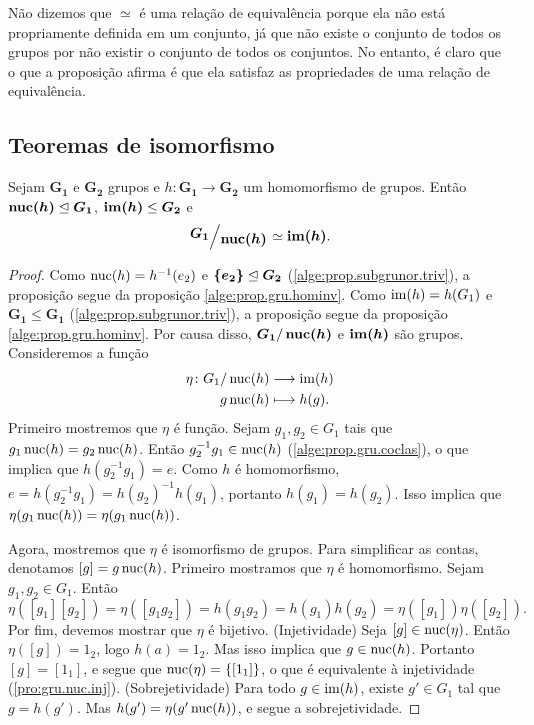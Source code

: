 Não dizemos que $\simeq$ é uma relação de equivalência porque ela não está propriamente definida em um conjunto, já que não existe o conjunto de todos os grupos por não existir o conjunto de todos os conjuntos. No entanto, é claro que o que a proposição afirma é que ela satisfaz as propriedades de uma relação de equivalência.

\subsection{Teoremas de isomorfismo}

\begin{theorem}
Sejam $\bm{G_1}$ e $\bm{G_2}$ grupos e $h: \bm{G_1} \to \bm{G_2}$ um homomorfismo de grupos. Então $\bm{\nuc(h)} \ide \bm{G_1}$, $\bm{\im(h)} \leq \bm{G_2}$ e
	\begin{equation*}
	\bm{\quo{G_1}{\nuc(h)}} \simeq \bm{\im(h)}.
	\end{equation*}
\end{theorem}
\begin{proof} Como $\operatorname{nuc}(h) = h^{-1}(e_2)$ e $\bm{\{e_2\}} \mathrel{\unlhd} \bm{G_2}$ (\ref{alge:prop.subgrunor.triv}), a proposição segue da proposição \ref{alge:prop.gru.hominv}. Como $\operatorname{im}(h) = h(G_1)$ e $\bm{G_1} \leq \bm{G_1}$ (\ref{alge:prop.subgrunor.triv}), a proposição segue da proposição \ref{alge:prop.gru.hominv}. Por causa disso, $\bm{G_1}/\bm{\nuc(h)}$ e $\bm{\im(h)}$ são grupos. Consideremos a função
		\begin{align*}
		{\eta}\colon {G_1 / \operatorname{nuc}(h)} &\longrightarrow {\operatorname{im}(h)} \\{g\operatorname{nuc}(h)} &\longmapsto h(g).
		\end{align*}
Primeiro mostremos que $\eta$ é função. Sejam $g_1,g_2 \in G_1$ tais que $g_1\operatorname{nuc}(h) = g_2\operatorname{nuc}(h)$. Então $g_2^{-1}g_1 \in \operatorname{nuc}(h)$ (\ref{alge:prop.gru.coclas}), o que implica que $h(g_2^{-1}g_1) = e$. Como $h$ é homomorfismo, $e = h(g_2^{-1}g_1) = h(g_2)^{-1}h(g_1)$, portanto $h(g_1)=h(g_2)$. Isso implica que $\eta(g_1\operatorname{nuc}(h))=\eta(g_1\operatorname{nuc}(h))$.

Agora, mostremos que $\eta$ é isomorfismo de grupos. Para simplificar as contas, denotamos $[g] = g\operatorname{nuc}(h)$. Primeiro mostramos que $\eta$ é homomorfismo. Sejam $g_1,g_2 \in G_1$. Então
	\begin{equation*}
	\eta([g_1][g_2]) = \eta([g_1g_2]) = h(g_1g_2) = h(g_1)h(g_2) = \eta([g_1])\eta([g_2]).
	\end{equation*}
Por fim, devemos mostrar que $\eta$ é bijetivo. (Injetividade) Seja $[g] \in \operatorname{nuc}(\eta)$. Então $\eta([g])=1_{2}$, logo $h(a)=1_2$. Mas isso implica que $g \in \operatorname{nuc}(h)$. Portanto $[g]=[1_1]$, e segue que $\operatorname{nuc}(\eta)=\{[1_1]\}$, o que é equivalente à injetividade (\ref{pro:gru.nuc.inj}). (Sobrejetividade) Para todo $g \in \operatorname{im}(h)$, existe $g' \in G_1$ tal que $g=h(g')$. Mas $h(g')=\eta(g'\operatorname{nuc}(h))$, e segue a sobrejetividade.
\end{proof}

